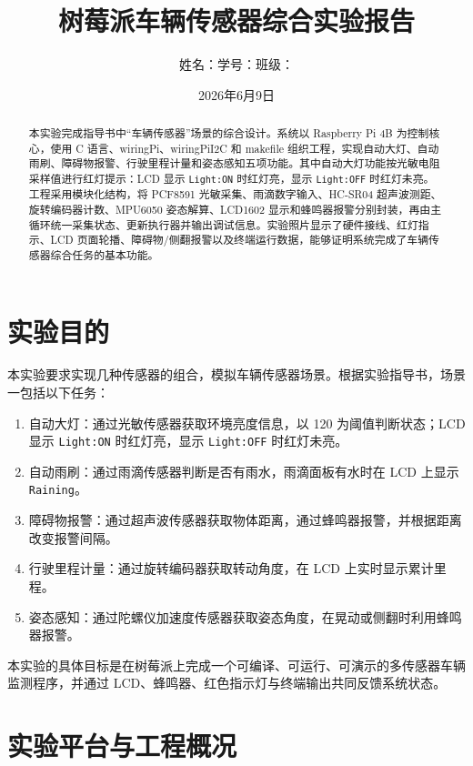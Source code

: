 \documentclass[UTF8,a4paper,12pt]{ctexart}
\title{树莓派车辆传感器综合实验报告}
\author{姓名：\underline{\hspace{2.4cm}}\quad 学号：\underline{\hspace{3.2cm}}\quad 班级：\underline{\hspace{2.4cm}}}
\date{2026年6月9日}
\begin{document}
\maketitle

\begin{abstract}
本实验完成指导书中“车辆传感器”场景的综合设计。系统以 Raspberry Pi 4B 为控制核心，使用 C 语言、wiringPi、wiringPiI2C 和 makefile 组织工程，实现自动大灯、自动雨刷、障碍物报警、行驶里程计量和姿态感知五项功能。其中自动大灯功能按光敏电阻采样值进行红灯提示：LCD 显示 \texttt{Light:ON} 时红灯亮，显示 \texttt{Light:OFF} 时红灯未亮。工程采用模块化结构，将 PCF8591 光敏采集、雨滴数字输入、HC-SR04 超声波测距、旋转编码器计数、MPU6050 姿态解算、LCD1602 显示和蜂鸣器报警分别封装，再由主循环统一采集状态、更新执行器并输出调试信息。实验照片显示了硬件接线、红灯指示、LCD 页面轮播、障碍物/侧翻报警以及终端运行数据，能够证明系统完成了车辆传感器综合任务的基本功能。
\end{abstract}

\section{实验目的}

本实验要求实现几种传感器的组合，模拟车辆传感器场景。根据实验指导书，场景一包括以下任务：

\begin{enumerate}
  \item 自动大灯：通过光敏传感器获取环境亮度信息，以 120 为阈值判断状态；LCD 显示 \texttt{Light:ON} 时红灯亮，显示 \texttt{Light:OFF} 时红灯未亮。
  \item 自动雨刷：通过雨滴传感器判断是否有雨水，雨滴面板有水时在 LCD 上显示 \texttt{Raining}。
  \item 障碍物报警：通过超声波传感器获取物体距离，通过蜂鸣器报警，并根据距离改变报警间隔。
  \item 行驶里程计量：通过旋转编码器获取转动角度，在 LCD 上实时显示累计里程。
  \item 姿态感知：通过陀螺仪加速度传感器获取姿态角度，在晃动或侧翻时利用蜂鸣器报警。
\end{enumerate}

本实验的具体目标是在树莓派上完成一个可编译、可运行、可演示的多传感器车辆监测程序，并通过 LCD、蜂鸣器、红色指示灯与终端输出共同反馈系统状态。

\section{实验平台与工程概况}
\end{document}
